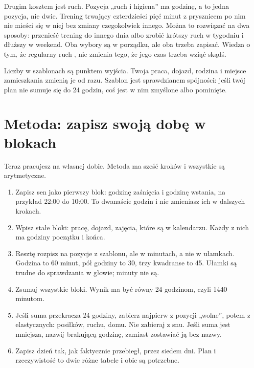Drugim kosztem jest ruch. Pozycja „ruch i higiena” ma godzinę, a to jedna pozycja, nie dwie. Trening trwający czterdzieści pięć minut z prysznicem po nim nie mieści się w niej bez zmiany czegokolwiek innego. Można to rozwiązać na dwa sposoby: przenieść trening do innego dnia albo zrobić krótszy ruch w tygodniu i dłuższy w weekend. Oba wybory są w porządku, ale oba trzeba zapisać. Wiedza o tym, że regularny ruch , nie zmienia tego, że jego czas trzeba wziąć skądś.

\begin{uwaga}
Liczby w szablonach są punktem wyjścia. Twoja praca, dojazd, rodzina i miejsce zamieszkania zmienią je od razu. Szablon jest sprawdzianem spójności: jeśli twój plan nie sumuje się do 24 godzin, coś jest w nim zmyślone albo pominięte.
\end{uwaga}

\section{Metoda: zapisz swoją dobę w blokach}

Teraz pracujesz na własnej dobie. Metoda ma sześć kroków i wszystkie są arytmetyczne.

\begin{enumerate}
\item Zapisz sen jako pierwszy blok: godzinę zaśnięcia i godzinę wstania, na przykład 22:00 do 10:00. To dwanaście godzin i nie zmieniasz ich w dalszych krokach.
\item Wpisz stałe bloki: pracę, dojazd, zajęcia, które są w kalendarzu. Każdy z nich ma godziny początku i końca.
\item Resztę rozpisz na pozycje z szablonu, ale w minutach, a nie w ułamkach. Godzina to 60 minut, pół godziny to 30, trzy kwadranse to 45. Ułamki są trudne do sprawdzania w głowie; minuty nie są.
\item Zsumuj wszystkie bloki. Wynik ma być równy 24 godzinom, czyli 1440 minutom.
\item Jeśli suma przekracza 24 godziny, zabierz najpierw z pozycji „wolne”, potem z elastycznych: posiłków, ruchu, domu. Nie zabieraj z snu. Jeśli suma jest mniejsza, nazwij brakującą godzinę, zamiast zostawiać ją bez nazwy.
\item Zapisz dzień tak, jak faktycznie przebiegł, przez siedem dni. Plan i rzeczywistość to dwie różne tabele i obie są potrzebne.
\end{enumerate}

